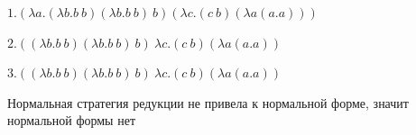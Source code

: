 \documentclass{article}
\begin{document}
$1.(\lambda a.(\lambda b.b\ b) (\lambda b.b\ b)\ b) (\lambda c.(c\ b) (\lambda a(a.a)))$

$2.((\lambda b.b\ b) (\lambda b.b\ b)\ b)\ \lambda c.(c\ b) (\lambda a(a.a))$

$3.((\lambda b.b\ b) (\lambda b.b\ b)\ b)\ \lambda c.(c\ b) (\lambda a(a.a))$

\noindent Нормальная стратегия редукции не привела к нормальной форме, значит нормальной формы нет
\end{document}

